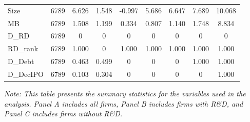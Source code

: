\documentclass[12pt, times]{article}
\begin{document}
\begin{table}[h!]
\begin{tabular}{lcccccccc}
        Size & 6789 & 6.626 & 1.548 & -0.997 & 5.686 & 6.647 & 7.689 & 10.068 \\
        MB & 6789 & 1.508 & 1.199 & 0.334 & 0.807 & 1.140 & 1.748 & 8.834 \\
        D\_RD & 6789 & 0 & 0 & 0 & 0 & 0 & 0 & 0 \\
        RD\_rank & 6789 & 1.000 & 0 & 1.000 & 1.000 & 1.000 & 1.000 & 1.000 \\
        D\_Debt & 6789 & 0.463 & 0.499 & 0 & 0 & 0 & 1.000 & 1.000 \\
        D\_DecIPO & 6789 & 0.103 & 0.304 & 0 & 0 & 0 & 0 & 1.000 \\
        \bottomrule
    \end{tabular}
    \newline
    \textit{Note: This table presents the summary statistics for the variables used in the analysis. Panel A includes all firms, Panel B includes firms with R\&D, and Panel C includes firms without R\&D.}
\end{table}
\end{document}
